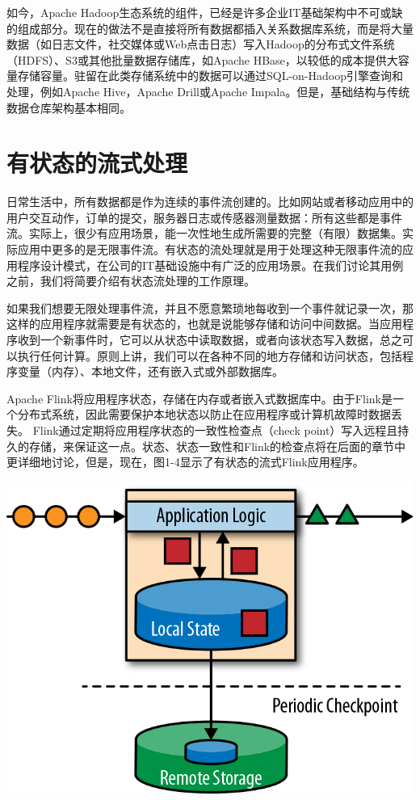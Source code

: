 \documentclass[oneside]{ctexbook}
\begin{document}
如今，Apache Hadoop生态系统的组件，已经是许多企业IT基础架构中不可或缺的组成部分。现在的做法不是直接将所有数据都插入关系数据库系统，而是将大量数据（如日志文件，社交媒体或Web点击日志）写入Hadoop的分布式文件系统（HDFS）、S3或其他批量数据存储库，如Apache HBase，以较低的成本提供大容量存储容量。驻留在此类存储系统中的数据可以通过SQL-on-Hadoop引擎查询和处理，例如Apache Hive，Apache Drill或Apache Impala。但是，基础结构与传统数据仓库架构基本相同。

\section{有状态的流式处理}

日常生活中，所有数据都是作为连续的事件流创建的。比如网站或者移动应用中的用户交互动作，订单的提交，服务器日志或传感器测量数据：所有这些都是事件流。实际上，很少有应用场景，能一次性地生成所需要的完整（有限）数据集。实际应用中更多的是无限事件流。有状态的流处理就是用于处理这种无限事件流的应用程序设计模式，在公司的IT基础设施中有广泛的应用场景。在我们讨论其用例之前，我们将简要介绍有状态流处理的工作原理。

如果我们想要无限处理事件流，并且不愿意繁琐地每收到一个事件就记录一次，那这样的应用程序就需要是有状态的，也就是说能够存储和访问中间数据。当应用程序收到一个新事件时，它可以从状态中读取数据，或者向该状态写入数据，总之可以执行任何计算。原则上讲，我们可以在各种不同的地方存储和访问状态，包括程序变量（内存）、本地文件，还有嵌入式或外部数据库。

Apache Flink将应用程序状态，存储在内存或者嵌入式数据库中。由于Flink是一个分布式系统，因此需要保护本地状态以防止在应用程序或计算机故障时数据丢失。 Flink通过定期将应用程序状态的一致性检查点（check point）写入远程且持久的存储，来保证这一点。状态、状态一致性和Flink的检查点将在后面的章节中更详细地讨论，但是，现在，图1-4显示了有状态的流式Flink应用程序。

\noindent\includegraphics[]{images/spaf_0104.png}
\end{document}
